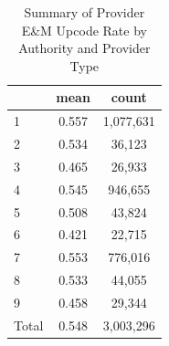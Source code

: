 \begin{table}[htbp]\centering
\def\sym#1{\ifmmode^{#1}\else\(^{#1}\)\fi}
\caption{Summary of Provider E\&M Upcode Rate by Authority and Provider Type}
\begin{tabular}{l*{1}{cc}}
\toprule
                    &        mean&       count\\
\midrule
1                   &       0.557&   1,077,631\\
2                   &       0.534&      36,123\\
3                   &       0.465&      26,933\\
4                   &       0.545&     946,655\\
5                   &       0.508&      43,824\\
6                   &       0.421&      22,715\\
7                   &       0.553&     776,016\\
8                   &       0.533&      44,055\\
9                   &       0.458&      29,344\\
Total               &       0.548&   3,003,296\\
\bottomrule
\end{tabular}
\end{table}
